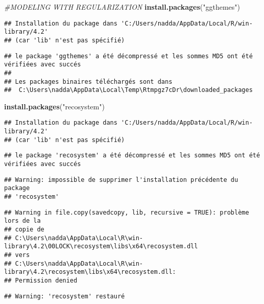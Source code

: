 \documentclass[
]{article}
\newenvironment{Shaded}{\begin{snugshade}}{\end{snugshade}}
\newcommand{\CommentTok}[1]{\textcolor[rgb]{0.56,0.35,0.01}{\textit{#1}}}
\newcommand{\FunctionTok}[1]{\textcolor[rgb]{0.13,0.29,0.53}{\textbf{#1}}}
\newcommand{\NormalTok}[1]{#1}
\newcommand{\StringTok}[1]{\textcolor[rgb]{0.31,0.60,0.02}{#1}}
\begin{document}
\begin{Shaded}
\begin{Highlighting}[]
\CommentTok{\#MODELING WITH REGULARIZATION}
\FunctionTok{install.packages}\NormalTok{(}\StringTok{"ggthemes"}\NormalTok{)}
\end{Highlighting}
\end{Shaded}

\begin{verbatim}
## Installation du package dans 'C:/Users/nadda/AppData/Local/R/win-library/4.2'
## (car 'lib' n'est pas spécifié)
\end{verbatim}

\begin{verbatim}
## le package 'ggthemes' a été décompressé et les sommes MD5 ont été vérifiées avec succés
## 
## Les packages binaires téléchargés sont dans
##  C:\Users\nadda\AppData\Local\Temp\Rtmpgz7cDr\downloaded_packages
\end{verbatim}

\begin{Shaded}
\begin{Highlighting}[]
\FunctionTok{install.packages}\NormalTok{(}\StringTok{"recosystem"}\NormalTok{)}
\end{Highlighting}
\end{Shaded}

\begin{verbatim}
## Installation du package dans 'C:/Users/nadda/AppData/Local/R/win-library/4.2'
## (car 'lib' n'est pas spécifié)
\end{verbatim}

\begin{verbatim}
## le package 'recosystem' a été décompressé et les sommes MD5 ont été vérifiées avec succés
\end{verbatim}

\begin{verbatim}
## Warning: impossible de supprimer l'installation précédente du package
## 'recosystem'
\end{verbatim}

\begin{verbatim}
## Warning in file.copy(savedcopy, lib, recursive = TRUE): problème lors de la
## copie de
## C:\Users\nadda\AppData\Local\R\win-library\4.2\00LOCK\recosystem\libs\x64\recosystem.dll
## vers
## C:\Users\nadda\AppData\Local\R\win-library\4.2\recosystem\libs\x64\recosystem.dll:
## Permission denied
\end{verbatim}

\begin{verbatim}
## Warning: 'recosystem' restauré
\end{verbatim}
\end{document}
